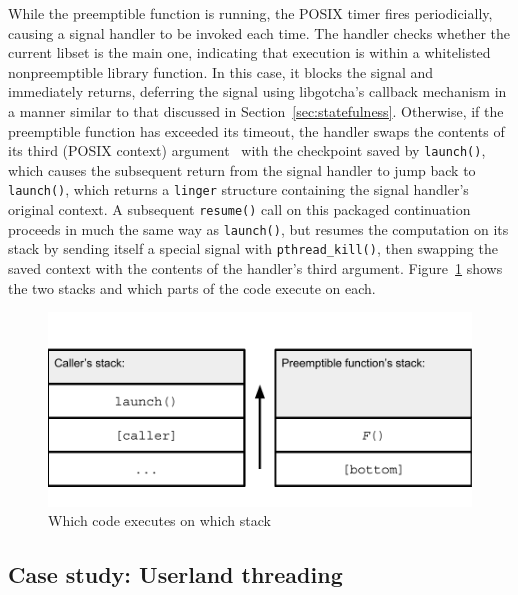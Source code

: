 While the preemptible function is running, the POSIX timer fires periodicially,
causing a signal handler to be invoked each time.  The handler checks whether the
current libset is the main one, indicating that execution is within a whitelisted
nonpreemptible library function.  In this case, it blocks the signal and immediately
returns, deferring the signal using libgotcha's callback mechanism in a manner
similar to that discussed in Section~\ref{sec:statefulness}.  Otherwise, if the
preemptible function has exceeded its timeout, the handler swaps the contents of its
third (POSIX context) argument~\cite{sigaction-manpage} with the checkpoint saved by
\texttt{launch()}, which causes the subsequent return from the signal handler to jump
back to \texttt{launch()}, which returns a \texttt{linger} structure containing the
signal handler's original context.  A subsequent \texttt{resume()} call on this
packaged continuation proceeds in much the same way as \texttt{launch()}, but
resumes the computation on its stack by sending itself a special signal with
\texttt{pthread\_kill()}, then swapping the saved context with the contents of the
handler's third argument.  Figure~\ref{fig:twostacks} shows the two stacks and which
parts of the code execute on each.

\begin{figure}
\includegraphics[width=\columnwidth]{figs/twostacks}
\caption{Which code executes on which stack}
\label{fig:twostacks}
\end{figure}



\subsection{Case study: Userland threading}
\label{sec:threading}
